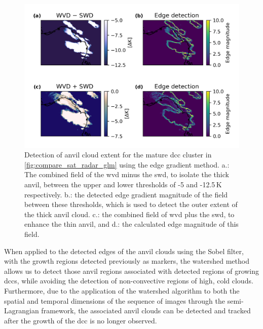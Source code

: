 \begin{figure}[tp]
    \includegraphics[width=\textwidth]{figures/chapter1_17.png}
    \caption[
    Detection of anvil cloud extent for the mature \acrshort{dcc} cluster in \ref{fig:compare_sat_radar_glm} using the edge gradient method
    ]{
    Detection of anvil cloud extent for the mature \acrshort{dcc} cluster in \ref{fig:compare_sat_radar_glm} using the edge gradient method. a.: The combined field of the \acrshort{wvd} minus the \acrshort{swd}, to isolate the thick anvil, between the upper and lower thresholds of -5 and -12.5\,\unit{K} respectively. b.: the detected edge gradient magnitude of the field between these thresholds, which is used to detect the outer extent of the thick anvil cloud. c.: the combined field of \acrshort{wvd} plus the \acrshort{swd}, to enhance the thin anvil, and d.: the calculated edge magnitude of this field.
    }
    \label{fig:edge_detection}
\end{figure}


When applied to the detected edges of the anvil clouds using the Sobel filter, with the growth regions detected previously as markers, the watershed method allows us to detect those anvil regions associated with detected regions of growing \acrshort{dcc}s, while avoiding the detection of non-convective regions of high, cold clouds.
Furthermore, due to the application of the watershed algorithm to both the spatial and temporal dimensions of the sequence of images through the semi-Lagrangian framework, the associated anvil clouds can be detected and tracked after the growth of the \acrshort{dcc} is no longer observed.

